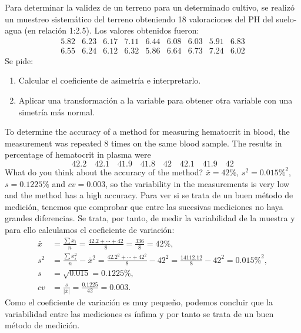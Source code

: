 {Para determinar la validez de un terreno para un determinado cultivo, se realizó un muestreo sistemático del terreno obteniendo 18 valoraciones del PH del suelo-agua (en relación 1:2.5).
Los valores obtenidos fueron:
\[
\begin{array}{ccccccccc}
5.82 & 6.23 & 6.17 & 7.11 & 6.44 & 6.08 & 6.03 & 5.91 & 6.83 \\
6.55 & 6.24 & 6.12 & 6.32 & 5.86 & 6.64 & 6.73 & 7.24 & 6.02
\end{array}
\]
Se pide:
\begin{enumerate}
\item Calcular el coeficiente de asimetría e interpretarlo.
\item Aplicar una transformación a la variable para obtener otra variable con una simetría más normal.
\end{enumerate}
}


{To determine the accuracy of a method for measuring hematocrit in blood, the measurement was repeated 8 times on
the same blood sample.
The results in percentage of hematocrit in plasma were
\[
42.2\quad 42.1\quad 41.9\quad 41.8\quad 42\quad 42.1\quad 41.9\quad 42
\]
What do you think about the accuracy of the method?
}
{$\bar x= 42\%$, $s^2=0.015\%^2$, $s=0.1225\%$ and $cv=0.003$, so the variability in the measurements is very low and the method has a high accuracy.
}
{Para ver si se trata de un buen método de medición, tenemos que comprobar que entre las sucesivas mediciones no haya grandes diferencias. Se trata, por tanto, de medir la variabilidad de la muestra y para ello calculamos el coeficiente de variación:
\begin{align*}
\bar x & = \frac{\sum x_i}{n} = \frac{42.2+\cdots+42}{8} = \frac{336}{8}= 42\%,\\
s^2 & = \frac{\sum x_i^2}{n}-\bar x^2 = \frac{42.2^2+\cdots+42^2}{8}-42^2 = \frac{14112.12}{8}-42^2= 0.015\%^2,\\
s &= \sqrt{0.015} = 0.1225\%,\\
cv &= \frac{s}{|\bar x|} = \frac{0.1225}{42} = 0.003.
\end{align*}
Como el coeficiente de variación es muy pequeño, podemos concluir que la variabilidad entre las mediciones es ínfima y por tanto se trata de un buen método de medición.
}


